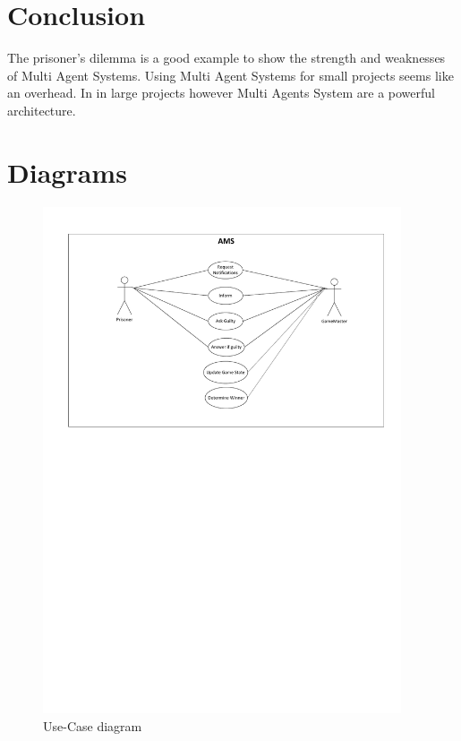 \documentclass[a4paper,12pt]{article}
\begin{document}
\section{Conclusion}
The prisoner's dilemma is a good example to show the strength and weaknesses of Multi Agent Systems.
Using Multi Agent Systems for small projects seems like an overhead.
In in large projects however Multi Agents System are a powerful architecture.

\newpage

\appendix

\section{Diagrams}

\begin{figure}[h]
	\centering
	\includegraphics[width=400px]{usecases.pdf}
	\caption{Use-Case diagram}
	\label{fig:usecase}
\end{figure}
\end{document}

